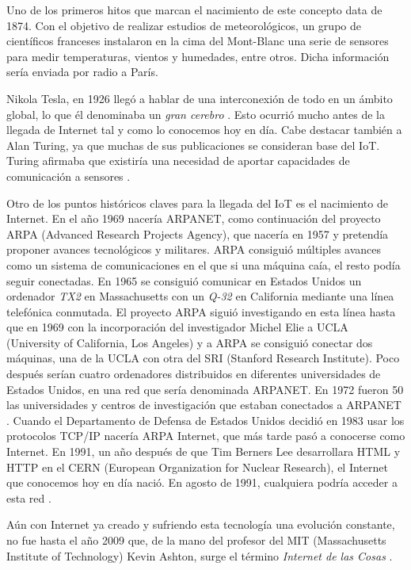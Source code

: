 \documentclass[a4paper, 12pt, oneside]{book}
\begin{document}
Uno de los primeros hitos que marcan el nacimiento de este concepto data de 1874. Con el objetivo de realizar estudios de meteorológicos, un grupo de científicos franceses instalaron en la cima del Mont-Blanc una serie de sensores para medir temperaturas, vientos y humedades, entre otros. Dicha información sería enviada por radio a París\cite{iot_origen}.

Nikola Tesla, en 1926 llegó a hablar de una interconexión de todo en un ámbito global, lo que él denominaba un \textit{gran cerebro} \cite{gran_cerebro_tesla}. Esto ocurrió mucho antes de la llegada de Internet tal y como lo conocemos hoy en día. Cabe destacar también a Alan Turing, ya que muchas de sus publicaciones se consideran base del IoT.  Turing afirmaba que existiría una necesidad de aportar capacidades de comunicación a sensores \cite{alan_turing_iot}.

Otro de los puntos históricos claves para la llegada del IoT es el nacimiento de Internet. En el año 1969 nacería ARPANET, como continuación del proyecto ARPA (Advanced Research Projects Agency), que nacería en 1957 y  pretendía proponer avances tecnológicos y militares. ARPA consiguió múltiples avances como un sistema de comunicaciones en el que si una máquina caía, el resto podía seguir conectadas. 
En 1965 se consiguió comunicar en Estados Unidos un ordenador \textit{TX2} en Massachusetts con un \textit{Q-32} en California mediante una línea telefónica conmutada.
El proyecto ARPA siguió investigando en esta línea hasta que en 1969 con la incorporación del investigador Michel Elie a UCLA (University of California, Los Angeles) y a ARPA se consiguió conectar dos máquinas, una de la UCLA con otra del SRI (Stanford Research Institute). Poco después serían cuatro ordenadores distribuidos en diferentes universidades de Estados Unidos, en una red que sería denominada ARPANET.
En 1972 fueron 50 las universidades y centros de investigación que estaban conectados a ARPANET \cite{arpa_arpanet}.
Cuando el Departamento de Defensa de Estados Unidos decidió en 1983 usar los protocolos TCP/IP nacería ARPA Internet, que más tarde pasó a conocerse como Internet. En 1991, un año después de que Tim Berners Lee desarrollara HTML y HTTP en el CERN (European Organization for Nuclear Research), el Internet que conocemos hoy en día nació. En agosto de 1991, cualquiera podría acceder a esta red \cite{Tim_Berners_Lee}.

Aún con Internet ya creado y sufriendo esta tecnología una evolución constante, no fue hasta el año 2009 que, de la mano del profesor del MIT (Massachusetts Institute of Technology) Kevin Ashton, surge el término \textit{Internet de las Cosas} \cite{Kevin_Ashton}.
\end{document}
